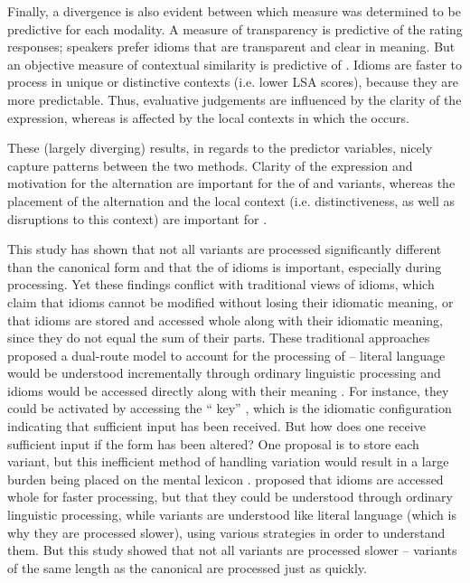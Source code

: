 \documentclass[output=paper
,modfonts
,nonflat]{langsci/langscibook}
\begin{document}
Finally, a divergence is also evident between which  measure was determined to be predictive for each modality. A measure of transparency is predictive of the  rating responses; speakers prefer idioms that are transparent and clear in meaning. But an objective measure of contextual similarity is predictive of . Idioms are faster to process in unique or distinctive contexts (i.e. lower LSA scores), because they are more predictable. Thus, evaluative judgements are influenced by the clarity of the expression, whereas  is affected by the local contexts in which the  occurs.

These (largely diverging) results,  in regards to the predictor variables, nicely capture patterns between the two methods. Clarity of the expression and motivation for the alternation are important for the  of  and variants, whereas the placement of the alternation and the local context (i.e. distinctiveness, as well as disruptions to this context) are important for .

This study has shown that not all variants are processed significantly different than the canonical form and that the  of idioms is important, especially during processing. Yet these findings conflict with traditional views of idioms, which claim that idioms cannot be modified without losing their idiomatic meaning, or that idioms are stored and accessed whole along with their idiomatic meaning, since they do not equal the sum of their parts. These traditional approaches proposed a dual-route model to account for the processing  of  -- literal language  would be understood incrementally through ordinary linguistic processing and idioms would be accessed directly along with their meaning \citep[cf.][]{SwinneyCutler1979, CacciariTabossi1988}. For instance, they could be activated by accessing the `` key'' \citep{CacciariTabossi1988}, which is the idiomatic configuration indicating that sufficient input has been received. But how does one receive sufficient input if the form has been altered? One proposal is to store each variant, but this inefficient method of handling variation  would result in a large burden being placed on the mental lexicon \citep{BaayenEtAl2013}. \citet{McGloneEtAl1994} proposed that idioms are accessed whole for faster processing, but that they could be understood through ordinary linguistic processing, while variants are understood like literal language  (which is why they are processed slower), using various strategies in order to understand them. But this study showed that not all variants are processed slower -- variants of the same length as the canonical are processed  just as quickly.
\end{document}
